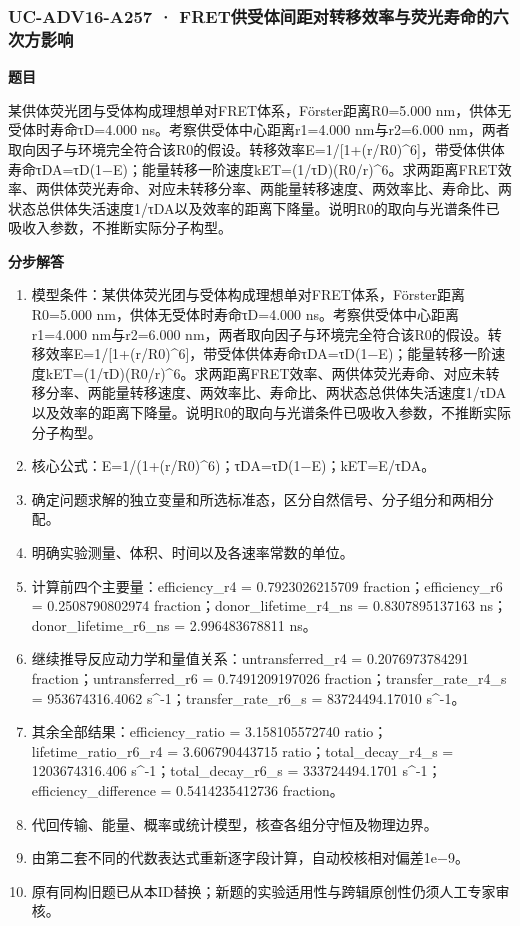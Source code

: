 \documentclass[UTF8,11pt,a4paper]{ctexart}
\begin{document}
\subsubsection*{UC-ADV16-A257 · FRET供受体间距对转移效率与荧光寿命的六次方影响}
\noindent\textbf{题目}\par
某供体荧光团与受体构成理想单对FRET体系，Förster距离R0=5.000 nm，供体无受体时寿命τD=4.000 ns。考察供受体中心距离r1=4.000 nm与r2=6.000 nm，两者取向因子与环境完全符合该R0的假设。转移效率E=1/[1+(r/R0)\textasciicircum{}6]，带受体供体寿命τDA=τD(1−E)；能量转移一阶速度kET=(1/τD)(R0/r)\textasciicircum{}6。求两距离FRET效率、两供体荧光寿命、对应未转移分率、两能量转移速度、两效率比、寿命比、两状态总供体失活速度1/τDA以及效率的距离下降量。说明R0的取向与光谱条件已吸收入参数，不推断实际分子构型。\par
\medskip\noindent\textbf{分步解答}
\begin{enumerate}
\item 模型条件：某供体荧光团与受体构成理想单对FRET体系，Förster距离R0=5.000 nm，供体无受体时寿命τD=4.000 ns。考察供受体中心距离r1=4.000 nm与r2=6.000 nm，两者取向因子与环境完全符合该R0的假设。转移效率E=1/[1+(r/R0)\textasciicircum{}6]，带受体供体寿命τDA=τD(1−E)；能量转移一阶速度kET=(1/τD)(R0/r)\textasciicircum{}6。求两距离FRET效率、两供体荧光寿命、对应未转移分率、两能量转移速度、两效率比、寿命比、两状态总供体失活速度1/τDA以及效率的距离下降量。说明R0的取向与光谱条件已吸收入参数，不推断实际分子构型。
\item 核心公式：E=1/(1+(r/R0)\textasciicircum{}6)；τDA=τD(1−E)；kET=E/τDA。
\item 确定问题求解的独立变量和所选标准态，区分自然信号、分子组分和两相分配。
\item 明确实验测量、体积、时间以及各速率常数的单位。
\item 计算前四个主要量：efficiency\_r4 = 0.7923026215709 fraction；efficiency\_r6 = 0.2508790802974 fraction；donor\_lifetime\_r4\_ns = 0.8307895137163 ns；donor\_lifetime\_r6\_ns = 2.996483678811 ns。
\item 继续推导反应动力学和量值关系：untransferred\_r4 = 0.2076973784291 fraction；untransferred\_r6 = 0.7491209197026 fraction；transfer\_rate\_r4\_s = 953674316.4062 s\textasciicircum{}-1；transfer\_rate\_r6\_s = 83724494.17010 s\textasciicircum{}-1。
\item 其余全部结果：efficiency\_ratio = 3.158105572740 ratio；lifetime\_ratio\_r6\_r4 = 3.606790443715 ratio；total\_decay\_r4\_s = 1203674316.406 s\textasciicircum{}-1；total\_decay\_r6\_s = 333724494.1701 s\textasciicircum{}-1；efficiency\_difference = 0.5414235412736 fraction。
\item 代回传输、能量、概率或统计模型，核查各组分守恒及物理边界。
\item 由第二套不同的代数表达式重新逐字段计算，自动校核相对偏差1e−9。
\item 原有同构旧题已从本ID替换；新题的实验适用性与跨辑原创性仍须人工专家审核。
\end{enumerate}
\end{document}
